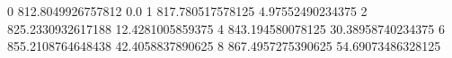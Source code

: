 0 812.8049926757812 0.0
1 817.780517578125 4.97552490234375
2 825.2330932617188 12.4281005859375
4 843.194580078125 30.38958740234375
6 855.2108764648438 42.4058837890625
8 867.4957275390625 54.69073486328125
